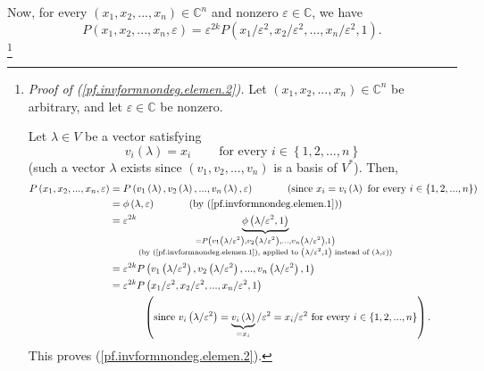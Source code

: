 \documentclass
[numbers=enddot,12pt,final,onecolumn,german,notitlepage]{scrartcl}%
\theoremstyle{definition}
\begin{document}
Now, for every $\left(  x_{1},x_{2},...,x_{n}\right)  \in\mathbb{C}^{n}$ and
nonzero $\varepsilon\in\mathbb{C}$, we have
\begin{equation}
P\left(  x_{1},x_{2},...,x_{n},\varepsilon\right)  =\varepsilon^{2k}P\left(
x_{1}/\varepsilon^{2},x_{2}/\varepsilon^{2},...,x_{n}/\varepsilon
^{2},1\right)  . \label{pf.invformnondeg.elemen.2}%
\end{equation}
\footnote{\textit{Proof of (\ref{pf.invformnondeg.elemen.2}).} Let $\left(
x_{1},x_{2},...,x_{n}\right)  \in\mathbb{C}^{n}$ be arbitrary, and let
$\varepsilon\in\mathbb{C}$ be nonzero.
\par
Let $\lambda\in V$ be a vector satisfying%
\[
v_{i}\left(  \lambda\right)  =x_{i}\ \ \ \ \ \ \ \ \ \ \text{for every }%
i\in\left\{  1,2,...,n\right\}
\]
(such a vector $\lambda$ exists since $\left(  v_{1},v_{2},...,v_{n}\right)  $
is a basis of $V^{\ast}$). Then,%
\begin{align*}
P\left(  x_{1},x_{2},...,x_{n},\varepsilon\right)   &  =P\left(  v_{1}\left(
\lambda\right)  ,v_{2}\left(  \lambda\right)  ,...,v_{n}\left(  \lambda
\right)  ,\varepsilon\right)  \ \ \ \ \ \ \ \ \ \ \left(  \text{since }%
x_{i}=v_{i}\left(  \lambda\right)  \text{ for every }i\in\left\{
1,2,...,n\right\}  \right) \\
&  =\phi\left(  \lambda,\varepsilon\right)  \ \ \ \ \ \ \ \ \ \ \left(
\text{by (\ref{pf.invformnondeg.elemen.1})}\right) \\
&  =\varepsilon^{2k}\underbrace{\phi\left(  \lambda/\varepsilon^{2},1\right)
}_{\substack{=P\left(  v_{1}\left(  \lambda/\varepsilon^{2}\right)
,v_{2}\left(  \lambda/\varepsilon^{2}\right)  ,...,v_{n}\left(  \lambda
/\varepsilon^{2}\right)  ,1\right)  \\\text{(by
(\ref{pf.invformnondeg.elemen.1}), applied to }\left(  \lambda/\varepsilon
^{2},1\right)  \text{ instead of }\left(  \lambda,\varepsilon\right)
\text{)}}}\\
&  =\varepsilon^{2k}P\left(  v_{1}\left(  \lambda/\varepsilon^{2}\right)
,v_{2}\left(  \lambda/\varepsilon^{2}\right)  ,...,v_{n}\left(  \lambda
/\varepsilon^{2}\right)  ,1\right) \\
&  =\varepsilon^{2k}P\left(  x_{1}/\varepsilon^{2},x_{2}/\varepsilon
^{2},...,x_{n}/\varepsilon^{2},1\right) \\
&  \ \ \ \ \ \ \ \ \ \ \left(  \text{since }v_{i}\left(  \lambda
/\varepsilon^{2}\right)  =\underbrace{v_{i}\left(  \lambda\right)  }_{=x_{i}%
}/\varepsilon^{2}=x_{i}/\varepsilon^{2}\text{ for every }i\in\left\{
1,2,...,n\right\}  \right)  .
\end{align*}
This proves (\ref{pf.invformnondeg.elemen.2}).}
\end{document}
